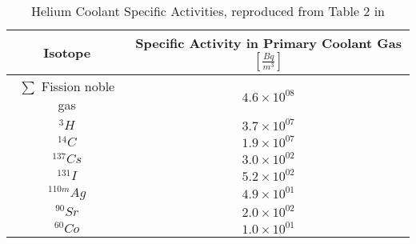 \begin{table}[h!]
\centering
\begin{tabular}{ c   c }
\hline
Isotope & Specific Activity in Primary Coolant Gas $[\frac{Bq}{m^3}]$  \\
\hline
$\sum$ Fission noble gas & $4.6\times10^{08}$  \\
$^{3}H$ & $3.7\times10^{07}$  \\
$^{14}C$ & $1.9\times10^{07}$  \\
$^{137}Cs$ & $3.0\times10^{02}$ \\
$^{131}I$ & $5.2\times10^{02}$ \\
$^{110m}Ag$ & $4.9\times10^{01}$  \\
$^{90}Sr$ & $2.0\times10^{02}$  \\
$^{60}Co$ & $1.0\times10^{01}$ \\
\hline
\end{tabular}
\caption{Helium Coolant Specific Activities, reproduced from Table 2 in \cite{noauthor_results_1990}}
\label{table:gas-acc}
\end{table}